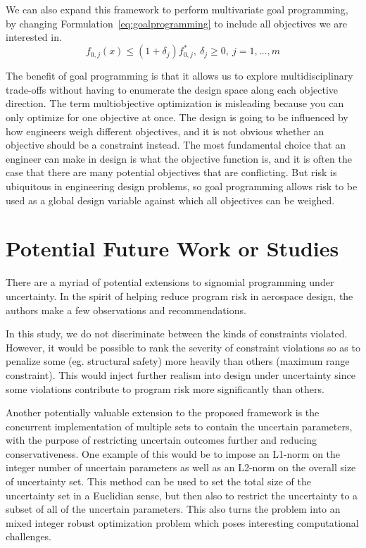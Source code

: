 We can also expand this framework to perform multivariate goal programming,
by changing Formulation~\ref{eq:goalprogramming} to include all
objectives we are interested in.
\begin{equation}
    f_{0,j}(x) \leq (1+\delta_j) f^*_{0,j},~\delta_j \geq 0,~j = 1,\ldots, m
    \label{eq:multigoal}
\end{equation}

The benefit of goal programming is that it allows us to explore multidisciplinary trade-offs without
having to enumerate the design space along each objective direction.
The term multiobjective optimization is misleading
because you can only optimize for one objective at once.
The design is going to be influenced by how engineers weigh different objectives, and
it is not obvious whether an objective should be a constraint instead. The most
fundamental choice that an engineer can make in design is what the objective function is, and it is
often the case that there are many potential objectives that are conflicting.
But risk is ubiquitous in engineering design problems, so goal programming allows risk to be used as
a global design variable against which all objectives can be weighed.

\section{Potential Future Work or Studies}

There are a myriad of potential extensions to signomial programming under uncertainty.
In the spirit of helping reduce program risk in aerospace design,
the authors make a few observations and recommendations.

In this study, we do not discriminate between the kinds of constraints violated. However, it would
be possible to rank the severity of constraint violations so as to penalize some (eg. structural safety)
more heavily than others (maximum range constraint). This would inject further realism into
design under uncertainty since some violations contribute to program risk more
significantly than others.

Another potentially valuable extension to the proposed framework is the concurrent implementation
of multiple sets to contain the uncertain parameters, with the purpose of restricting uncertain
outcomes further and reducing conservativeness.
One example of this would be to impose an  L1-norm on the integer number of uncertain parameters
as well as an L2-norm on the overall size of uncertainty set.
This method can be used to set the total size of the uncertainty set in a Euclidian sense,
but then also to restrict the uncertainty to a subset of all of the uncertain parameters.
This also turns the problem into an mixed integer robust
optimization problem which poses interesting computational challenges.

